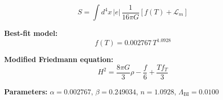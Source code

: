 
\begin{equation}
  S = \int d^4x \, |e| \, \frac{1}{16\pi G} \left[ f(T) + \mathcal{L}_m \right]
\end{equation}

\textbf{Best-fit model:}
\begin{equation}
  f(T) = 0.002767 \, T^{1.0928}
\end{equation}

\textbf{Modified Friedmann equation:}
\begin{equation}
  H^2 = \frac{8\pi G}{3} \rho - \frac{f}{6} + \frac{T f_T}{3}
\end{equation}

\textbf{Parameters:}
$\alpha = 0.002767$, \quad
$\beta = 0.249034$, \quad
$n = 1.0928$, \quad
$\Lambda_{\text{BI}} = 0.0100$